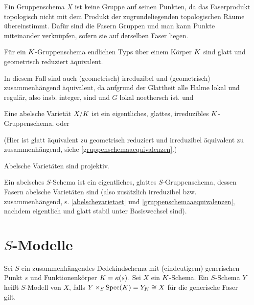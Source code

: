 \documentclass[german]{scrreprt}
\begin{document}
\begin{Definition}[$S$-Gruppenschema]
\begin{Bemerkung}
  Ein Gruppenschema $X$ ist keine Gruppe auf seinen Punkten, da das
  Faserprodukt topologisch nicht mit dem Produkt der zugrundeliegenden
  topologischen Räume übereinstimmt.
  Dafür sind die Fasern Gruppen und man kann Punkte miteinander
  verknüpfen, sofern sie auf derselben Faser liegen.
\end{Bemerkung}

\begin{Bemerkung}\label{gruppenschemaaequivalenzen}
  Für ein $K$-Gruppenschema endlichen Typs über einem Körper $K$
  sind glatt und geometrisch reduziert äquivalent.
  \cite[8.5, Excercise 11]{bosch}
  
  In diesem Fall sind auch (geometrisch) irreduzibel und (geometrisch)
  zusammenhängend äquivalent, da aufgrund der Glattheit alle Halme
  lokal und regulär, also insb. integer, sind und $G$ lokal noethersch
  ist.
  \cite[s.][Exercise 3.16]{wedhorn} und \cite[Corollary 16.51]{wedhorn}
\end{Bemerkung}
\end{Definition}


\begin{Definition}\label{abelschevarietaet}
Eine abelsche Varietät $X/K$ ist ein eigentliches, glattes,
irreduzibles $K$-Gruppenschema.
\cite[9.6, Definition 1]{bosch} oder \cite[Definition 16.52]{wedhorn}

(Hier ist glatt äquivalent zu geometrisch reduziert und irreduzibel
äquivalent zu zusammenhängend, 
siehe \ref{gruppenschemaaequivalenzen}.)

\begin{Bemerkung}
Abelsche Varietäten sind projektiv.
\cite[9.6, Proposition 4]{bosch}
\end{Bemerkung}
\end{Definition}

\begin{Definition}
Ein abelsches $S$-Schema ist ein eigentliches, glattes $S$-Gruppenschema,
dessen Fasern abelsche Varietäten sind 
(also zusätzlich irreduzibel bzw. zusammenhängend,
s. \ref{abelschevarietaet} und \ref{gruppenschemaaequivalenzen},
nachdem eigentlich und glatt stabil unter Basiswechsel sind).
\end{Definition}

\chapter{$S$-Modelle}
\begin{Definition}[$S$-Modell]
Sei $S$ ein zusammenhängendes Dedekindschema mit (eindeutigem)
generischen Punkt $s$ und Funktionenkörper $K=\kappa(s)$.
Sei $X$ ein $K$-Schema.
Ein $S$-Schema $Y$ heißt $S$-Modell von $X$, falls
$Y\times_S\operatorname{Spec}(K)=Y_K\cong X$ für die generische Faser gilt.
\end{Definition}
\end{document}
